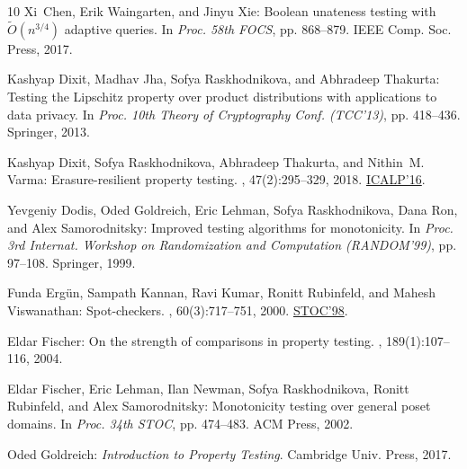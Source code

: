 \documentclass[11pt]{article}
\numberwithin{equation}{section}
\theoremstyle{definition}
\theoremstyle{plain}
\begin{document}
\begin{thebibliography}{10}
{\sc Xi~Chen, Erik Waingarten, and Jinyu Xie}: Boolean unateness testing with
  $\widetilde{O}(n^{3/4})$ adaptive queries.
\newblock In {\em Proc. 58th FOCS}, pp. 868--879. IEEE Comp. Soc. Press, 2017.

{\sc Kashyap Dixit, Madhav Jha, Sofya Raskhodnikova, and Abhradeep Thakurta}:
  Testing the {Lipschitz} property over product distributions with applications
  to data privacy.
\newblock In {\em Proc. 10th Theory of Cryptography Conf. (TCC'13)}, pp.
  418--436. Springer, 2013.

{\sc Kashyap Dixit, Sofya Raskhodnikova, Abhradeep Thakurta, and Nithin~M.
  Varma}: Erasure-resilient property testing.
, 47(2):295--329, 2018.
\newblock \prelim
  \href{https://doi.org/10.4230/LIPIcs.ICALP.2016.91}{ICALP'16}.

{\sc Yevgeniy Dodis, Oded Goldreich, Eric Lehman, Sofya Raskhodnikova, Dana
  Ron, and Alex Samorodnitsky}: Improved testing algorithms for monotonicity.
\newblock In {\em Proc. 3rd Internat. Workshop on Randomization and Computation
  (RANDOM'99)}, pp. 97--108. Springer, 1999.
\newblock [\epfmtdoi{10.1007/978-3-540-48413-4\_10}]

{\sc Funda Erg{\"{u}}n, Sampath Kannan, Ravi Kumar, Ronitt Rubinfeld, and
  Mahesh Viswanathan}: Spot-checkers.
, 60(3):717--751, 2000.
\newblock \prelim \href{https://doi.org/10.1145/276698.276757}{STOC'98}.

{\sc Eldar Fischer}: On the strength of comparisons in property testing.
, 189(1):107--116, 2004.
\newblock [\epfmtdoi{10.1016/j.ic.2003.09.003}]

{\sc Eldar Fischer, Eric Lehman, Ilan Newman, Sofya Raskhodnikova, Ronitt
  Rubinfeld, and Alex Samorodnitsky}: Monotonicity testing over general poset
  domains.
\newblock In {\em Proc. 34th STOC}, pp. 474--483. ACM Press, 2002.
\newblock [\epfmtdoi{10.1145/509907.509977}]

{\sc Oded Goldreich}: {\em Introduction to Property Testing}.
\newblock Cambridge Univ. Press, 2017.
\newblock [\epfmtdoi{10.1017/9781108135252}]


\end{thebibliography}
\end{document}
